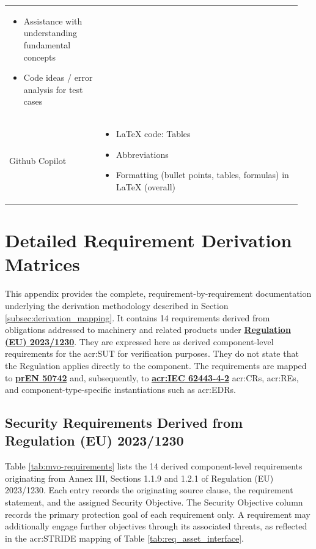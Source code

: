 \begin{table}[hbt]
\begin{tabular}{>{\raggedright\arraybackslash}p{0.3\linewidth} >{\raggedright\arraybackslash}p{0.65\linewidth}}
\begin{itemize}[noitemsep,topsep=0pt,partopsep=0pt,parsep=0pt]
			\item Assistance with understanding fundamental concepts
			\item Code ideas / error analysis for test cases
		\end{itemize} \\ 
		Github Copilot	&	\vspace{-\topsep}
		\begin{itemize}[noitemsep,topsep=0pt,partopsep=0pt,parsep=0pt] 
			\item LaTeX code: Tables
			\item Abbreviations
			\item Formatting (bullet points, tables, formulas) in LaTeX (overall)
		\end{itemize} \\ 
		\hline 
	\end{tabular} 
\end{table}

\clearpage



\chapter{Detailed Requirement Derivation Matrices}
\label{app:requirement_derivation}


This appendix provides the complete, requirement-by-requirement documentation underlying the derivation methodology described in Section \ref{subsec:derivation_mapping}. It contains 14 requirements derived from obligations addressed to machinery and related products under \hyperref[subsec:eu_machinery_regulation]{\textbf{Regulation (EU) 2023/1230}}. They are expressed here as derived component-level requirements for the \gls{acr:SUT} for verification purposes. They do not state that the Regulation applies directly to the component. The requirements are mapped to \hyperref[subsec:pren_50742]{\textbf{prEN 50742}} and, subsequently, to \hyperref[subsec:iec_62443]{\textbf{\gls{acr:IEC} 62443-4-2}} \glspl{acr:CR}, \glspl{acr:RE}, and component-type-specific instantiations such as \glspl{acr:EDR}. 

\section{Security Requirements Derived from Regulation (EU) 2023/1230}
\label{app:sec:mvo_requirements}

Table \ref{tab:mvo-requirements} lists the 14 derived component-level requirements originating from Annex III, Sections 1.1.9 and 1.2.1 of Regulation (EU) 2023/1230. Each entry records the originating source clause, the requirement statement, and the assigned Security Objective. The Security Objective column records the primary protection goal of each requirement only. A requirement may additionally engage further objectives through its associated threats, as reflected in the \gls{acr:STRIDE} mapping of Table \ref{tab:req_asset_interface}.



